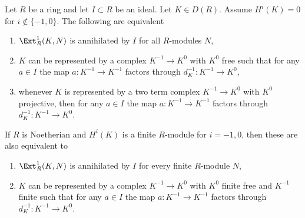 \begin{lemma}
\label{lemma-ext-1-annihilated-definite}
Let $R$ be a ring and let $I \subset R$ be an ideal.
Let $K \in D(R)$. Assume $H^i(K) = 0$ for $i \not \in \{-1, 0\}$.
The following are equivalent
\begin{enumerate}
\item $\Ext^1_R(K, N)$ is annihilated by $I$ for all $R$-modules $N$,
\item $K$ can be represented by a complex $K^{-1} \to K^0$
with $K^0$ free such that for any $a \in I$ the map
$a : K^{-1} \to K^{-1}$ factors through $d_K^{-1} : K^{-1} \to K^0$,
\item whenever $K$ is represented by a two term complex
$K^{-1} \to K^0$ with $K^0$ projective, then for any $a \in I$ the map
$a : K^{-1} \to K^{-1}$ factors through $d_K^{-1} : K^{-1} \to K^0$.
\end{enumerate}
If $R$ is Noetherian and $H^i(K)$ is a finite $R$-module for $i = -1, 0$,
then these are also equivalent to
\begin{enumerate}
\item[(4)] $\Ext^1_R(K, N)$ is annihilated by $I$ for every finite
$R$-module $N$,
\item[(5)] $K$ can be represented by a complex $K^{-1} \to K^0$
with $K^0$ finite free and $K^{-1}$ finite such that for any $a \in I$ the map
$a : K^{-1} \to K^{-1}$ factors through $d_K^{-1} : K^{-1} \to K^0$.
\end{enumerate}
\end{lemma}